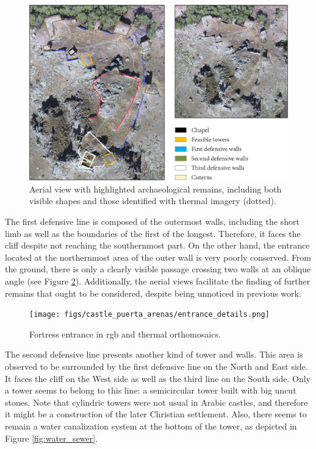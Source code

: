 \begin{figure}[htbp]
    \centering
    \includegraphics[width=\linewidth]{figs/castle_puerta_arenas/castle_annotations.png}
    \caption{Aerial view with highlighted archaeological remains, including both visible shapes and those identified with thermal imagery (dotted). }
    \label{fig:archaeological_remains_structure}
\end{figure}

The first defensive line is composed of the outermost walls, including the short limb as well as the boundaries of the first of the longest. Therefore, it faces the cliff despite not reaching the southernmost part. On the other hand, the entrance located at the northernmost area of the outer wall is very poorly conserved. From the ground, there is only a clearly visible passage crossing two walls at an oblique angle (see Figure \ref{fig:entrance_details}). Additionally, the aerial views facilitate the finding of further remains that ought to be considered, despite being unnoticed in previous work. 

\begin{figure}[htbp]
    \centering
    \texttt{[image: figs/castle\_puerta\_arenas/entrance\_details.png]}
    \caption{Fortress entrance in \acrshort{rgb} and thermal orthomosaics.}
    \label{fig:entrance_details}
\end{figure}

The second defensive line presents another kind of tower and walls. This area is observed to be surrounded by the first defensive line on the North and East side. It faces the cliff on the West side as well as the third line on the South side. Only a tower seems to belong to this line: a semicircular tower built with big uncut stones. Note that cylindric towers were not usual in Arabic castles, and therefore it might be a construction of the later Christian settlement. Also, there seems to remain a water canalization system at the bottom of the tower, as depicted in Figure \ref{fig:water_sewer}.

